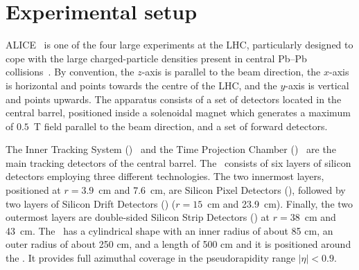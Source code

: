 \section{Experimental setup}
\label{Sec:ExpSetup}
ALICE~\cite{Aamodt:2008zz,Abelev:2014ffa} is one of the four large experiments at the LHC, particularly designed to cope with the large charged-particle densities present in central Pb--Pb collisions~\cite{Aamodt:2010pb}. By convention, the $z$-axis is parallel to the beam direction, the $x$-axis is horizontal and points towards the centre of the LHC, and the $y$-axis is vertical and points upwards. The apparatus consists of a set of detectors located in the central barrel, positioned inside a solenoidal magnet which generates a maximum of $0.5$~T field parallel to the beam direction, and a set of forward detectors. 

The Inner Tracking System (\ITS)~\cite{Aamodt:2008zz} and the Time Projection Chamber (\TPC)~\cite{Alme:2010ke} are the main tracking detectors of the central barrel. The \ITS~consists of six layers of silicon detectors employing three different technologies. The two innermost layers, positioned at $r = 3.9$~cm and 7.6~cm,  are Silicon Pixel Detectors (\SPD), followed by two layers of Silicon Drift Detectors (\SDD) ($r = 15$~cm and 23.9~cm). Finally, the two outermost layers are double-sided Silicon Strip Detectors (\SSD) at $r = 38$~cm and 43~cm. The \TPC~has a cylindrical shape with an inner radius of about 85 cm, an outer radius of about 250 cm, and a length of 500 cm and it is positioned around the \ITS. It provides full azimuthal coverage in the pseudorapidity range $|\eta| < 0.9$. 

